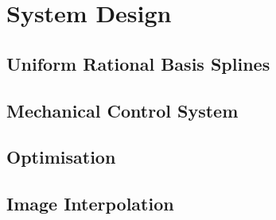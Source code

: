 \chapter{System Design}


\section{Uniform Rational Basis Splines}
\label{sec:design-urbs}
	
	
	

\section{Mechanical Control System}
\label{sec:design-control}
	

\section{Optimisation}
\label{sec:design-optimisation}
	
	
	
	
	


\section{Image Interpolation}
\label{sec:design-interpolation}
		